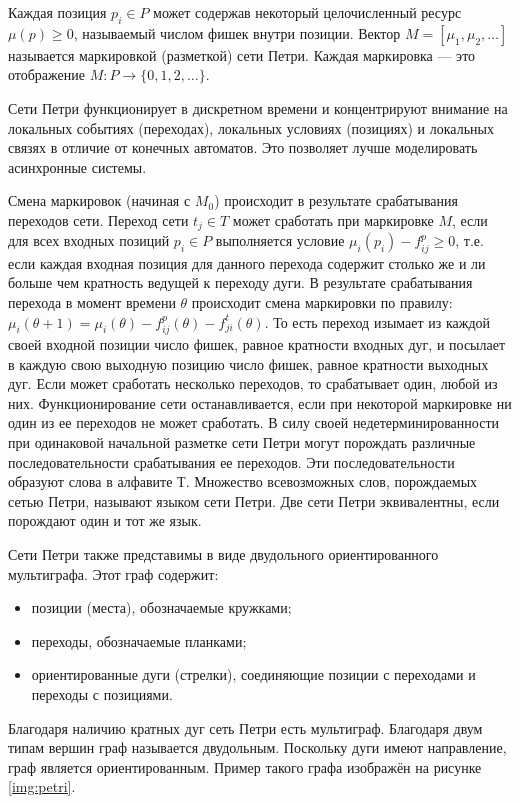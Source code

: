 Каждая позиция $p_i \in P$ может содержав некоторый целочисленный ресурс $\mu(p) \ge 0$, называемый числом фишек внутри позиции. Вектор $M = [\mu_1, \mu_2, \ldots]$ называется маркировкой (разметкой) сети Петри. Каждая маркировка --- это отображение $M: P \rightarrow \{0,1,2,\ldots\}$. 

Сети Петри функционирует в дискретном времени и концентрируют внимание на локальных событиях (переходах), локальных условиях (позициях) и локальных связях в отличие от конечных автоматов. Это позволяет лучше моделировать асинхронные системы.

Смена маркировок (начиная с $M_0$) происходит в результате срабатывания переходов сети. Переход сети $t_j \in T$ может сработать при маркировке $M$, если для всех входных позиций $p_i \in P$ выполняется условие $\mu_i(p_i) - f_{ij}^p \ge 0$, т.е. если каждая входная позиция для данного перехода содержит столько же и ли больше чем кратность ведущей к переходу дуги. В результате срабатывания перехода в момент времени $\theta$ происходит смена маркировки по правилу: $\mu_i(\theta + 1) = \mu_i(\theta) - f_{ij}^p(\theta) -  f_{ji}^t(\theta)$. То есть переход изымает из каждой своей входной позиции число фишек, равное кратности входных дуг, и посылает в каждую свою выходную позицию число фишек, равное кратности выходных дуг. Если может сработать несколько переходов, то срабатывает один, любой из них. Функционирование сети останавливается, если при некоторой маркировке ни один из ее переходов не может сработать. В силу своей недетерминированности при одинаковой начальной разметке сети Петри могут порождать различные последовательности срабатывания ее переходов. Эти последовательности образуют слова в алфавите Т. Множество всевозможных слов, порождаемых сетью Петри, называют языком сети Петри. Две сети Петри эквивалентны, если порождают один и тот же язык.

Сети Петри также представимы в виде двудольного ориентированного мультиграфа. Этот граф содержит:
\begin{itemize}[label=---]
	\item позиции (места), обозначаемые кружками;
	\item переходы, обозначаемые планками;
	\item ориентированные дуги (стрелки), соединяющие позиции с переходами и переходы с позициями.
\end{itemize}
Благодаря наличию кратных дуг сеть Петри есть мультиграф. Благодаря двум типам вершин граф называется двудольным. Поскольку дуги имеют направление, граф является ориентированным. Пример такого графа изображён на рисунке \ref{img:petri}.

\FloatBarrier